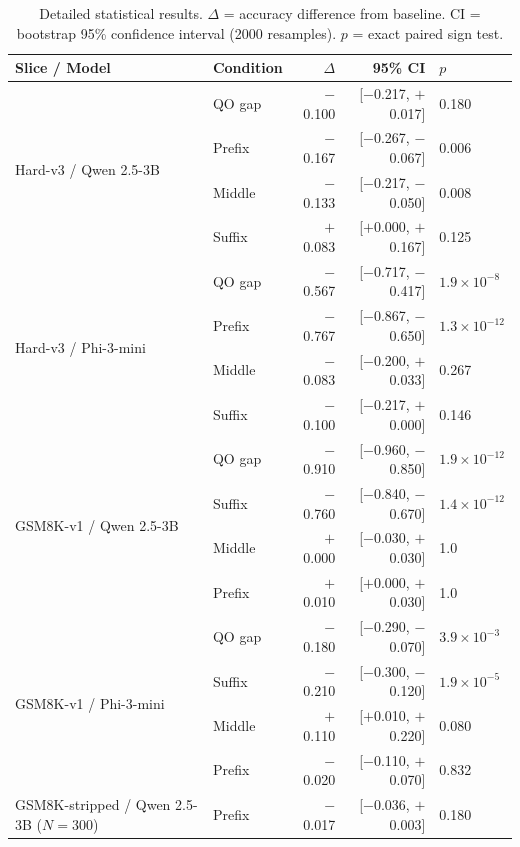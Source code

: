 \documentclass{article}
\theoremstyle{definition}
\theoremstyle{definition}
\begin{document}
\begin{table}[t]
  \centering
  \small
  \caption{Detailed statistical results. $\Delta$ = accuracy difference from
  baseline. CI = bootstrap 95\% confidence interval (2000 resamples).
  $p$ = exact paired sign test.}
  \label{tab:detailed-stats}
  \begin{tabular}{llrrl}
    \toprule
    Slice / Model & Condition & $\Delta$ & 95\% CI & $p$ \\
    \midrule
    \multirow{4}{*}{Hard-v3 / Qwen 2.5-3B}
      & QO gap    & $-$0.100 & [$-$0.217, $+$0.017] & 0.180 \\
      & Prefix    & $-$0.167 & [$-$0.267, $-$0.067] & 0.006 \\
      & Middle    & $-$0.133 & [$-$0.217, $-$0.050] & 0.008 \\
      & Suffix    & $+$0.083 & [$+$0.000, $+$0.167] & 0.125 \\
    \midrule
    \multirow{4}{*}{Hard-v3 / Phi-3-mini}
      & QO gap    & $-$0.567 & [$-$0.717, $-$0.417] & $1.9 \times 10^{-8}$ \\
      & Prefix    & $-$0.767 & [$-$0.867, $-$0.650] & $1.3 \times 10^{-12}$ \\
      & Middle    & $-$0.083 & [$-$0.200, $+$0.033] & 0.267 \\
      & Suffix    & $-$0.100 & [$-$0.217, $+$0.000] & 0.146 \\
    \midrule
    \multirow{4}{*}{GSM8K-v1 / Qwen 2.5-3B}
      & QO gap    & $-$0.910 & [$-$0.960, $-$0.850] & $1.9 \times 10^{-12}$ \\
      & Suffix    & $-$0.760 & [$-$0.840, $-$0.670] & $1.4 \times 10^{-12}$ \\
      & Middle    & $+$0.000 & [$-$0.030, $+$0.030] & 1.0 \\
      & Prefix    & $+$0.010 & [$+$0.000, $+$0.030] & 1.0 \\
    \midrule
    \multirow{4}{*}{GSM8K-v1 / Phi-3-mini}
      & QO gap    & $-$0.180 & [$-$0.290, $-$0.070] & $3.9 \times 10^{-3}$ \\
      & Suffix    & $-$0.210 & [$-$0.300, $-$0.120] & $1.9 \times 10^{-5}$ \\
      & Middle    & $+$0.110 & [$+$0.010, $+$0.220] & 0.080 \\
      & Prefix    & $-$0.020 & [$-$0.110, $+$0.070] & 0.832 \\
    \midrule
    \multirow{3}{*}{GSM8K-stripped / Qwen 2.5-3B ($N{=}300$)}
      & Prefix    & $-$0.017 & [$-$0.036, $+$0.003] & 0.180 \\

\end{tabular}
\end{table}
\end{document}
